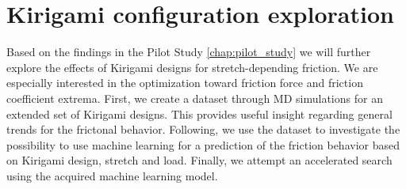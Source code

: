 \chapter{Kirigami configuration exploration}\label{chap:dataset_study}


Based on the findings in the Pilot Study \cref{chap:pilot_study} we will further explore the effects of Kirigami designs for stretch-depending friction. We are especially interested in the optimization toward friction force and friction coefficient extrema. First, we create a dataset through \acrshort{MD} simulations for an extended set of Kirigami designs. This provides useful insight regarding general trends for the frictonal behavior. Following, we use the dataset to investigate the possibility to use machine learning for a prediction of the friction behavior based on Kirigami design, stretch and load. Finally, we attempt an accelerated search using the acquired machine learning model.


